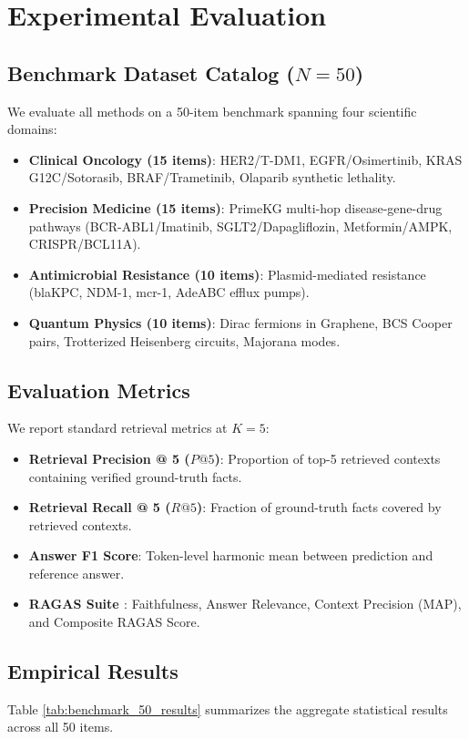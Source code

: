 \documentclass[runningheads]{llncs}
\begin{document}
\section{Experimental Evaluation}

\subsection{Benchmark Dataset Catalog ($N=50$)}
We evaluate all methods on a 50-item benchmark spanning four scientific domains:
\begin{itemize}
    \item \textbf{Clinical Oncology (15 items)}: HER2/T-DM1, EGFR/Osimertinib, KRAS G12C/Sotorasib, BRAF/Trametinib, Olaparib synthetic lethality.
    \item \textbf{Precision Medicine (15 items)}: PrimeKG multi-hop disease-gene-drug pathways (BCR-ABL1/Imatinib, SGLT2/Dapagliflozin, Metformin/AMPK, CRISPR/BCL11A).
    \item \textbf{Antimicrobial Resistance (10 items)}: Plasmid-mediated resistance (blaKPC, NDM-1, mcr-1, AdeABC efflux pumps).
    \item \textbf{Quantum Physics (10 items)}: Dirac fermions in Graphene, BCS Cooper pairs, Trotterized Heisenberg circuits, Majorana modes.
\end{itemize}

\subsection{Evaluation Metrics}
We report standard retrieval metrics at $K=5$:
\begin{itemize}
    \item \textbf{Retrieval Precision @ 5 ($P@5$)}: Proportion of top-5 retrieved contexts containing verified ground-truth facts.
    \item \textbf{Retrieval Recall @ 5 ($R@5$)}: Fraction of ground-truth facts covered by retrieved contexts.
    \item \textbf{Answer F1 Score}: Token-level harmonic mean between prediction and reference answer.
    \item \textbf{RAGAS Suite \cite{es2023ragas}}: Faithfulness, Answer Relevance, Context Precision (MAP), and Composite RAGAS Score.
\end{itemize}

\subsection{Empirical Results}
Table \ref{tab:benchmark_50_results} summarizes the aggregate statistical results across all 50 items.
\end{document}
